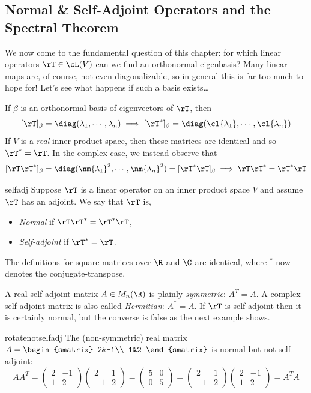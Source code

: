 \fi

\clearpage

\subsection{Normal \& Self-Adjoint Operators and the Spectral Theorem}

We now come to the fundamental question of this chapter: for which linear operators $\rT\in\cL(V)$ can we find an orthonormal eigenbasis? Many linear maps are, of course, not even diagonalizable, so in general this is far too much to hope for! Let's see what happens if such a basis exists\ldots\medbreak

If $\beta$ is an orthonormal basis of eigenvectors of $\rT$, then
\[[\rT]_\beta=\diag(\lambda_1,\cdots,\lambda_n)\implies [\rT^*]_\beta=\diag(\cl{\lambda_1},\cdots,\cl{\lambda_n})\]
If $V$ is a \emph{real} inner product space, then these matrices are identical and so $\rT^*=\rT$. In the complex case, we instead observe that
\[[\rT\rT^*]_\beta=\diag(\nm{\lambda_1}^2,\cdots,\nm{\lambda_n}^2)=[\rT^*\rT]_\beta \implies \rT\rT^*=\rT^*\rT\]

\begin{defn}{}{selfadj}
Suppose $\rT$ is a linear operator on an inner product space $V$ and assume $\rT$ has an adjoint. We say that $\rT$ is,
\begin{itemize}
	\item[]\emph{Normal} if $\rT\rT^*=\rT^*\rT$,
	\item[]\emph{Self-adjoint} if $\rT^*=\rT$.
\end{itemize}
The definitions for square matrices over $\R$ and $\C$ are identical, where $^*$ now denotes the conjugate-transpose.
\end{defn}

A real self-adjoint matrix $A\in M_n(\R)$ is plainly \emph{symmetric}: $A^T=A$. A complex self-adjoint matrix is also called \emph{Hermitian}: $A^*=A$.\smallbreak
If $\rT$ is self-adjoint then it is certainly normal, but the converse is false as the next example shows.

\begin{example}{}{rotatenotselfadj}
The (non-symmetric) real matrix $A=\begin{smatrix}
2&-1\\
1&2
\end{smatrix}$ is normal but not self-adjoint:
\[AA^T=\begin{pmatrix}
2&-1\\
1&2
\end{pmatrix}\begin{pmatrix}
2&1\\
-1&2
\end{pmatrix}=\begin{pmatrix}
5&0\\
0&5
\end{pmatrix}=\begin{pmatrix}
2&1\\
-1&2
\end{pmatrix}\begin{pmatrix}
2&-1\\
1&2
\end{pmatrix}=A^TA\]
\end{example}

